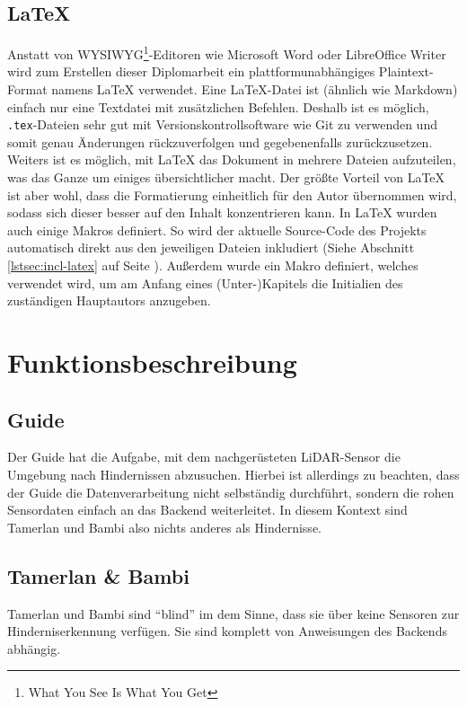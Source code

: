 \subsection{\LaTeX}
\label{subsec:latex}
Anstatt von WYSIWYG\footnote{What You See Is What You Get}-Editoren
wie Microsoft Word oder LibreOffice Writer wird zum Erstellen dieser Diplomarbeit
ein plattformunabhängiges Plaintext-Format namens LaTeX \cite{latex} verwendet.
%
Eine LaTeX-Datei ist (ähnlich wie Markdown) einfach nur eine Textdatei mit zusätzlichen Befehlen.
Deshalb ist es möglich, \texttt{.tex}-Dateien sehr gut mit Versionskontrollsoftware wie Git zu verwenden
und somit genau Änderungen rückzuverfolgen und gegebenenfalls zurückzusetzen.
%
Weiters ist es möglich, mit LaTeX das Dokument in mehrere Dateien aufzuteilen,
was das Ganze um einiges übersichtlicher macht.
%
Der größte Vorteil von LaTeX ist aber wohl,
dass die Formatierung einheitlich für den Autor übernommen wird,
sodass sich dieser besser auf den Inhalt konzentrieren kann.
%
In LaTeX wurden auch einige Makros definiert.
%
So wird der aktuelle Source-Code des Projekts automatisch direkt aus den
jeweiligen Dateien inkludiert (Siehe Abschnitt \ref{lstsec:incl-latex} auf Seite \pageref{lstsec:incl-latex}).
%
Außerdem wurde ein Makro definiert,
welches verwendet wird,
um am Anfang eines (Unter-)Kapitels die Initialien des zuständigen Hauptautors anzugeben. 

\section{Funktionsbeschreibung}
\label{subsec:funktionsbeschreibung}

\subsection{Guide}
Der Guide hat die Aufgabe,
mit dem nachgerüsteten LiDAR-Sensor die Umgebung nach Hindernissen abzusuchen.
%
Hierbei ist allerdings zu beachten,
dass der Guide die Datenverarbeitung nicht selbständig durchführt,
sondern die rohen Sensordaten einfach an das Backend weiterleitet.
%
In diesem Kontext sind Tamerlan und Bambi also nichts anderes als Hindernisse.

\subsection{Tamerlan \& Bambi}
Tamerlan und Bambi sind ``blind'' im dem Sinne,
dass sie über keine Sensoren zur Hinderniserkennung verfügen.
%
Sie sind komplett von Anweisungen des Backends abhängig.

